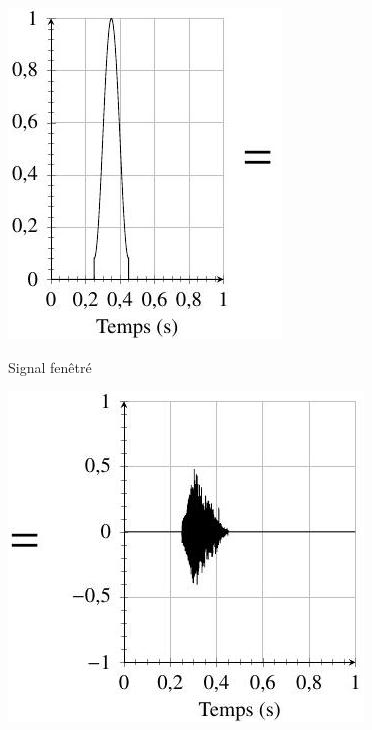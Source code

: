 \documentclass[10pt]{article}
\begin{document}
\includegraphics[max width=\textwidth]{2022_02_02_1af495ea60fb42b668bfg-04(1)}

Signal fenêtré

\includegraphics[max width=\textwidth]{2022_02_02_1af495ea60fb42b668bfg-04(2)}
\end{document}
